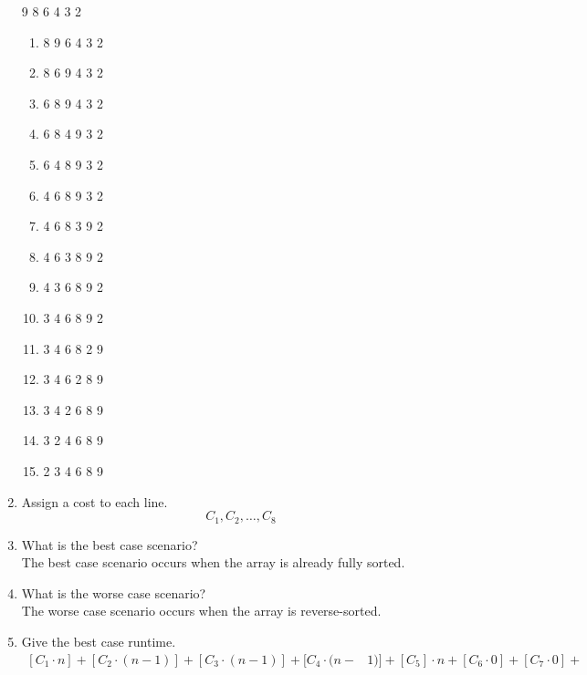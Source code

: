 \documentclass{article}
\begin{document}
\begin{enumerate}
\begin{multicols}{3}
\begin{center}
                  9 8 6 4 3 2
                  \begin{enumerate}[label=\arabic*.]
                      \itemsep -0.25em
                      \item 8 9 6 4 3 2
                      \item 8 6 9 4 3 2
                      \item 6 8 9 4 3 2
                      \item 6 8 4 9 3 2
                      \item 6 4 8 9 3 2
                      \item 4 6 8 9 3 2
                      \item 4 6 8 3 9 2
                      \item 4 6 3 8 9 2
                      \item 4 3 6 8 9 2
                      \item 3 4 6 8 9 2
                      \item 3 4 6 8 2 9
                      \item 3 4 6 2 8 9
                      \item 3 4 2 6 8 9
                      \item 3 2 4 6 8 9
                      \item 2 3 4 6 8 9
                  \end{enumerate}
              \end{center}
          \end{multicols}
    \item Assign a cost to each line. \\
          \[C_1, C_2, \dots, C_8\]
    \item What is the best case scenario? \\
          The best case scenario occurs when the array is already fully sorted.
    \item What is the worse case scenario? \\
          The worse case scenario occurs when the array is reverse-sorted.
    \item Give the best case runtime.
          \begin{equation*}
              \begin{split}
                  [C_1 \cdot n] +
                  [C_2 \cdot (n - 1)] +
                  [C_3 \cdot (n - 1)] +
                  [C_4 \cdot (n - & 1)] +
                  [C_5] \cdot n +
                  [C_6 \cdot 0] +
                  [C_7 \cdot 0] +

\end{split}
\end{equation*}
\end{enumerate}
\end{document}
